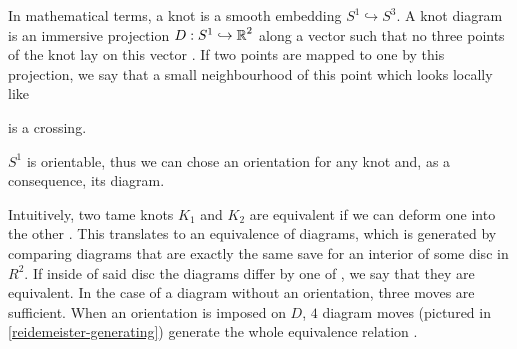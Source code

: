 In mathematical terms, a knot is a smooth embedding $S^1\hookrightarrow S^3$. A knot diagram is an {immersive projection} $D:S^1\hookrightarrow \operatorname{\mathbb{R}}^2$ along a vector such that no three points of the knot lay on this vector \cite{likorish-diagram}. If two points are mapped to one by this projection, we say that a small neighbourhood of this point which looks locally like  is a crossing.


$S^1$ is orientable, thus we can chose an orientation for any knot and, as a consequence, its diagram.

Intuitively, two tame knots $K_1$ and $K_2$ are equivalent if we can deform one into the other
\cite{murasagi-equivalence}. This translates to an equivalence of diagrams, which is generated by comparing diagrams that are exactly the same save for an interior of some disc in $R^2$. If inside of said disc the diagrams differ by one of , we say that they are equivalent. 
%
%
In the case of a diagram without an orientation, three moves are sufficient. When an orientation is imposed on $D$, $4$ diagram moves (pictured in \cref{reidemeister-generating}) generate the whole equivalence relation \cite{ruchy_zorientowane}.

